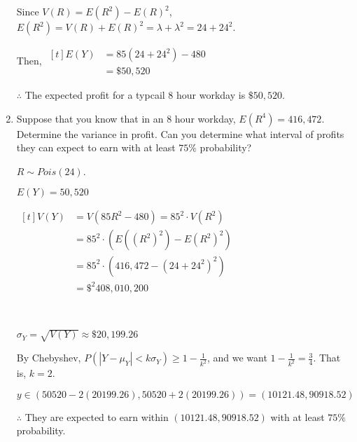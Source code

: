\begin{example}
\begin{enumerate}[label=\alph*)]
        Since $V(R) = E(R^2) - E(R)^2$, $E(R^2) = V(R) + E(R)^2 = \lambda + \lambda^2 = 24 + 24^2$. 

        Then, $\begin{aligned}[t]
            E(Y) & = 85 (24 + 24^2) - 480 \\
                 & = \$50,520
        \end{aligned}$

        $\therefore$ The expected profit for a typcail $8$ hour workday is $\$50,520$. 

        \item Suppose that you know that in an 8 hour workday, $E(R^4) = 416,472$. Determine the variance in profit. Can you determine what interval of profits they can expect to earn with at least $75\%$ probability?

        $R \sim Pois(24)$. 

        $E(Y) = 50,520$

        $\begin{aligned}[t]
            V(Y) & = V(85R^2 - 480) = 85^2 \cdot V(R^2)  \\
                 & = 85^2 \cdot (E((R^2)^2) - E(R^2)^2)  \\
                 & = 85^2 \cdot (416,472 - (24 + 24^2)^2) \\
                 & = \$^2 408,010,200
        \end{aligned}$

        {~~~}

        $\sigma_Y = \sqrt{V(Y)} \approx \$20,199.26$

        By Chebyshev, $P(|Y - \mu_Y| < k\sigma_Y) \ge 1 - \frac{1}{k^2}$, and we want $1 - \frac{1}{k^2} = \frac{3}{4}$. That is, $k = 2$. 

        $y \in (50520 - 2(20199.26), 50520 + 2(20199.26)) = (10121.48, 90918.52)$

        $\therefore$ They are expected to earn within $(10121.48, 90918.52)$ with at least $75\%$ probability. 
    \end{enumerate}
\end{example}